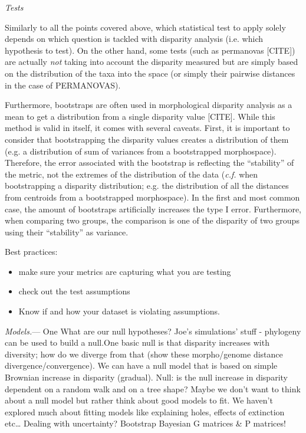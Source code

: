 \documentclass[12pt,letterpaper]{article}
\renewcommand{\subsection}[1]{%
\bigskip
\begin{center}
\begin{large}
\normalfont\itshape #1
\end{large}
\end{center}}
\renewcommand{\subsubsection}[1]{%
\vspace{2ex}
\noindent
\textit{#1.}---}
\begin{document}
\subsection{Tests}
Similarly to all the points covered above, which statistical test to apply solely depends on which question is tackled with disparity analysis (i.e. which hypothesis to test).
On the other hand, some tests (such as permanovas [CITE]) are actually \textit{not} taking into account the disparity measured but are simply based on the distribution of the taxa into the space (or simply their pairwise distances in the case of PERMANOVAS).

Furthermore, bootstraps are often used in morphological disparity analysis as a mean to get a distribution from a single disparity value [CITE].
While this method is valid in itself, it comes with several caveats.
First, it is important to consider that bootstrapping the disparity values creates a distribution of them (e.g. a distribution of sum of variances from a bootstrapped morphospace).
Therefore, the error associated with the bootstrap is reflecting the ``stability'' of the metric, not the extremes of the distribution of the data (\textit{c.f.} when bootstrapping a disparity distribution; e.g. the distribution of all the distances from centroids from a bootstrapped morphospace).
In the first and most common case, the amount of bootstraps artificially increases the type I error.
Furthermore, when comparing two groups, the comparison is one of the disparity of two groups using their ``stability'' as variance. 

Best practices:
\begin{itemize}
\item make sure your metrics are capturing what you are testing
\item check out the test assumptions
\item Know if and how your dataset is violating assumptions.
\end{itemize}

\subsubsection{Models}
One 
What are our null hypotheses?
Joe’s simulations’ stuff - phylogeny can be used to build a null.One basic null is that disparity increases with diversity; how do we diverge from that (show these morpho/genome distance divergence/convergence).
We can have a null model that is based on simple Brownian increase in disparity (gradual). 
Null: is the null increase in disparity dependent on a random walk and on a tree shape?
Maybe we don’t want to think about a null model but rather think about good models to fit. 
We haven’t explored much about fitting models like explaining holes, effects of extinction etc…
Dealing with uncertainty? Bootstrap Bayesian G matrices \& P matrices!
\end{document}
